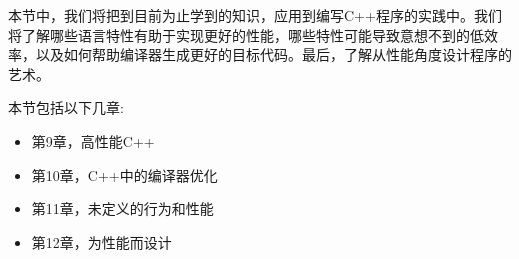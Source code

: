 
本节中，我们将把到目前为止学到的知识，应用到编写C++程序的实践中。我们将了解哪些语言特性有助于实现更好的性能，哪些特性可能导致意想不到的低效率，以及如何帮助编译器生成更好的目标代码。最后，了解从性能角度设计程序的艺术。

本节包括以下几章:

\begin{itemize}
\item 第9章，高性能C++
\item 第10章，C++中的编译器优化
\item 第11章，未定义的行为和性能
\item 第12章，为性能而设计
\end{itemize}

